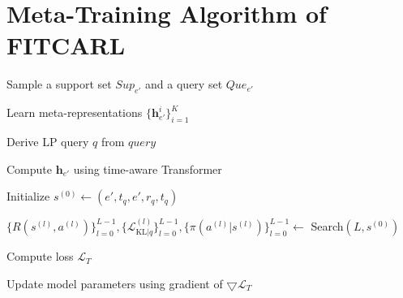 \documentclass[runningheads]{llncs}
\begin{document}
\section{Meta-Training Algorithm of FITCARL}
\begin{algorithm}[t]
\scriptsize
\caption{FITCARL Meta-Training}
\label{alg: one shot}

\DontPrintSemicolon
{}

{
{
Sample a support set $Sup_{e'}$ and a query set $Que_{e'}$



Learn meta-representations $\{\mathbf{h}_{e'}^i\}_{i=1}^K$
}
{
{
Derive LP query $q$ from $query$

Compute $\mathbf{h}_{e'}$ using time-aware Transformer 

Initialize $s^{(0)} \leftarrow (e', t_q, e', r_q, t_q)$

$\{R(s^{(l)}, a^{(l)})\}_{l=0}^{L-1}, \{\mathcal{L}_{\text{KL}|q}^{(l)}\}_{l=0}^{L-1}, \{\pi(a^{(l)}|s^{(l)})\}_{l=0}^{L-1}\leftarrow$ Search$(L,s^{(0)})$
}
}

Compute loss $\mathcal{L}_T$ 

Update model parameters using gradient of $\bigtriangledown	\mathcal{L}_T$




}
\end{algorithm}
\end{document}
